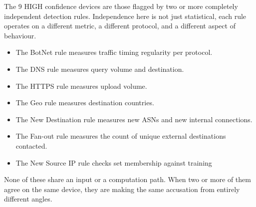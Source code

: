 \documentclass[
  11pt,
]{article}
\providecommand{\tightlist}{%
  \setlength{\itemsep}{0pt}\setlength{\parskip}{0pt}}
\begin{document}
The 9 HIGH confidence devices are those flagged by two or more
completely independent detection rules. Independence here is not just
statistical, each rule operates on a different metric, a different
protocol, and a different aspect of behaviour.

\begin{itemize}
\tightlist
\item
  The BotNet rule measures traffic timing regularity per protocol.
\item
  The DNS rule measures query volume and destination.
\item
  The HTTPS rule measures upload volume.
\item
  The Geo rule measures destination countries.
\item
  The New Destination rule measures new ASNs and new internal
  connections.
\item
  The Fan-out rule measures the count of unique external destinations
  contacted.
\item
  The New Source IP rule checks set membership against training
\end{itemize}

None of these share an input or a computation path. When two or more of
them agree on the same device, they are making the same accusation from
entirely different angles.
\end{document}
